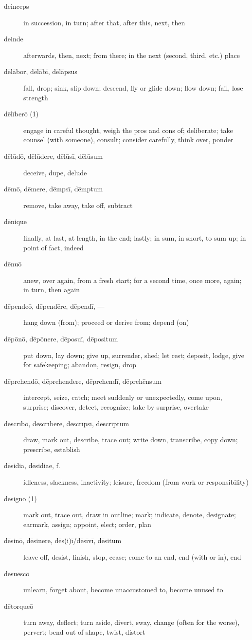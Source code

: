 \begin{description}
    \item[deinceps] in succession, in turn; after that, after this, next, then
    \item[deinde] afterwards, then, next; from there; in the next (second, third, etc.) place
    \item[dēlābor, dēlābī, dēlāpsus] fall, drop; sink, slip down; descend, fly or glide down; flow down; fail, lose strength
    \item[dēlīberō (1)] engage in careful thought, weigh the pros and cons of; deliberate; take counsel (with someone), consult; consider carefully, think over, ponder
    \item[dēlūdō, dēlūdere, dēlūsī, dēlūsum] deceive, dupe, delude
    \item[dēmō, dēmere, dēmpsī, dēmptum] remove, take away, take off, subtract
    \item[dēnique] finally, at last, at length, in the end; lastly; in sum, in short, to sum up; in point of fact, indeed
    \item[dēnuō] anew, over again, from a fresh start; for a second time, once more, again; in turn, then again
    \item[dēpendeō, dēpendēre, dēpendī, ---] hang down (from); proceed or derive from; depend (on)
    \item[dēpōnō, dēpōnere, dēposuī, dēpositum] put down, lay down; give up, surrender, shed; let rest; deposit, lodge, give for safekeeping; abandon, resign, drop
    \item[dēprehendō, dēprehendere, dēprehendī, dēprehēnsum] intercept, seize, catch; meet suddenly or unexpectedly, come upon, surprise; discover, detect, recognize; take by surprise, overtake
    \item[dēscrībō, dēscrībere, dēscrīpsī, dēscrīptum] draw, mark out, describe, trace out; write down, transcribe, copy down; prescribe, establish
    \item[dēsidia, dēsidiae, f.] idleness, slackness, inactivity; leisure, freedom (from work or responsibility)
    \item[dēsignō (1)] mark out, trace out, draw in outline; mark; indicate, denote, designate; earmark, assign; appoint, elect; order, plan
    \item[dēsinō, dēsinere, dēs(i)ī/dēsīvī, dēsitum] leave off, desist, finish, stop, cease; come to an end, end (with or in), end
    \item[dēsuēscō] unlearn, forget about, become unaccustomed to, become unused to
    \item[dētorqueō] turn away, deflect; turn aside, divert, sway, change (often for the worse), pervert; bend out of shape, twist, distort

\end{description}

